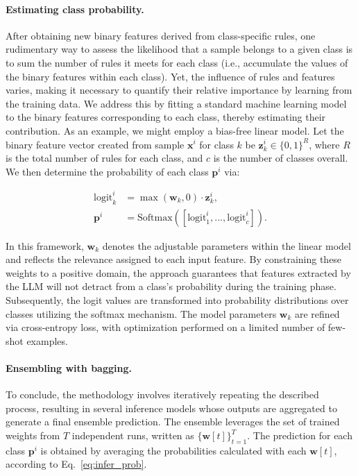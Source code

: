 \paragraph{Estimating class probability.} After obtaining new binary features derived from class-specific rules, one rudimentary way to assess the likelihood that a sample belongs to a given class is to sum the number of rules it meets for each class (i.e., accumulate the values of the binary features within each class). Yet, the influence of rules and features varies, making it necessary to quantify their relative importance by learning from the training data. We address this by fitting a standard machine learning model to the binary features corresponding to each class, thereby estimating their contribution. As an example, we might employ a bias-free linear model. Let the binary feature vector created from sample $\mathbf{x}^i$ for class $k$ be $\mathbf{z}_k^i \in \{0, 1\}^R$, where $R$ is the total number of rules for each class, and $c$ is the number of classes overall. We then determine the probability of each class $\mathbf{p}^i$ via:

\begin{align}
\text{logit}_k^i &= \max(\mathbf{w}_k, 0) \cdot \mathbf{z}_k^i, \nonumber \\
\mathbf{p}^i &= \text{Softmax}({[\text{logit}_{1}^i, ..., \text{logit}_{c}^i]}). \label{eq:infer_prob}
\end{align}

In this framework, $\mathbf{w}_k$ denotes the adjustable parameters within the linear model and reflects the relevance assigned to each input feature. By constraining these weights to a positive domain, the approach guarantees that features extracted by the LLM will not detract from a class's probability during the training phase. Subsequently, the logit values are transformed into probability distributions over classes utilizing the softmax mechanism. The model parameters $\mathbf{w}_k$ are refined via cross-entropy loss, with optimization performed on a limited number of few-shot examples.

\vspace*{-0.12in}
\paragraph{Ensembling with bagging.} To conclude, the methodology involves iteratively repeating the described process, resulting in several inference models whose outputs are aggregated to generate a final ensemble prediction. The ensemble leverages the set of trained weights from $T$ independent runs, written as $\{\mathbf{w}[t]\}_{t=1}^T$. The prediction for each class $\mathbf{p}^i$ is obtained by averaging the probabilities calculated with each $\mathbf{w}[t]$, according to Eq.~\ref{eq:infer_prob}.

